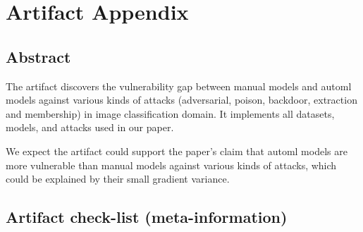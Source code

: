 \documentclass[letterpaper,twocolumn,10pt]{article}
\begin{document}


\appendix
\section{Artifact Appendix}

\subsection{Abstract}
The artifact discovers the vulnerability gap between manual models and automl models against various kinds of attacks (adversarial, poison, backdoor, extraction and membership) in image classification domain. It implements all datasets, models, and attacks used in our paper.

We expect the artifact could support the paper's claim that automl models are more vulnerable than manual models against various kinds of attacks, which could be explained by their small gradient variance.

\subsection{Artifact check-list (meta-information)}
\end{document}
